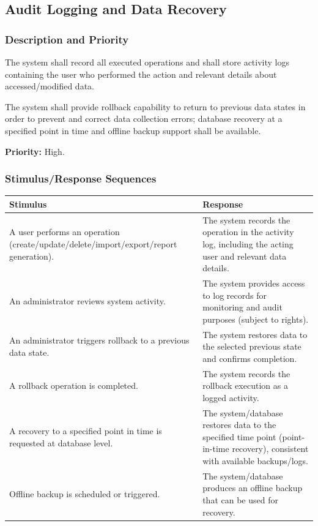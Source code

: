 \documentclass[11pt, a4paper]{article}
\begin{document}
\subsection{Audit Logging and Data Recovery}
\subsubsection{Description and Priority}
The system shall record all executed operations and shall store activity logs containing the user who performed the action and relevant details about accessed/modified data.

The system shall provide rollback capability to return to previous data states in order to prevent and correct data collection errors; database recovery at a specified point in time and offline backup support shall be available.

\textbf{Priority:} High.

\subsubsection{Stimulus/Response Sequences}
\begin{table}[H]
\begin{tabularx}{\textwidth}{>{\raggedright\arraybackslash}p{6cm} >{\raggedright\arraybackslash}X}
\toprule
\textbf{Stimulus} & \textbf{Response} \\
\midrule
A user performs an operation (create/update/delete/import/export/report generation). & The system records the operation in the activity log, including the acting user and relevant data details. \\
\midrule
An administrator reviews system activity. & The system provides access to log records for monitoring and audit purposes (subject to rights). \\
\midrule
An administrator triggers rollback to a previous data state. & The system restores data to the selected previous state and confirms completion. \\
\midrule
A rollback operation is completed. & The system records the rollback execution as a logged activity. \\
\midrule
A recovery to a specified point in time is requested at database level. & The system/database restores data to the specified time point (point-in-time recovery), consistent with available backups/logs. \\
\midrule
Offline backup is scheduled or triggered. & The system/database produces an offline backup that can be used for recovery. \\
\bottomrule
\end{tabularx}
\end{table}
\end{document}
